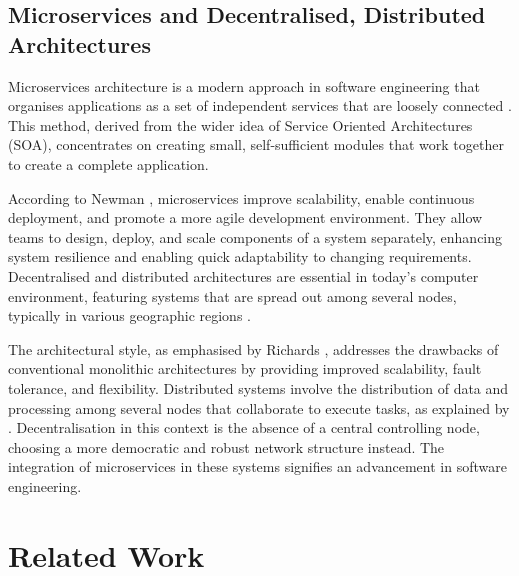 \documentclass[preprint,12pt]{elsarticle}
\begin{document}
\subsection{Microservices and Decentralised, Distributed Architectures} 

Microservices architecture is a modern approach in software engineering that organises applications as a set of independent services that are loosely connected \cite{bucchiarone2020microservices}. This method, derived from the wider idea of Service Oriented Architectures (SOA), concentrates on creating small, self-sufficient modules that work together to create a complete application. 

According to Newman \cite{newman2021building}, microservices improve scalability, enable continuous deployment, and promote a more agile development environment. They allow teams to design, deploy, and scale components of a system separately, enhancing system resilience and enabling quick adaptability to changing requirements. Decentralised and distributed architectures are essential in today's computer environment, featuring systems that are spread out among several nodes, typically in various geographic regions \cite{ataei2023application}. 

The architectural style, as emphasised by Richards \cite{richardson2018microservices}, addresses the drawbacks of conventional monolithic architectures by providing improved scalability, fault tolerance, and flexibility. Distributed systems involve the distribution of data and processing among several nodes that collaborate to execute tasks, as explained by \cite{Coulouris2005}. Decentralisation in this context is the absence of a central controlling node, choosing a more democratic and robust network structure instead. The integration of microservices in these systems signifies an advancement in software engineering. 


\section{Related Work}
\end{document}
